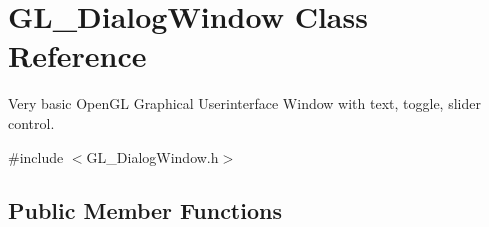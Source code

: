 \hypertarget{class_g_l___dialog_window}{\section{G\+L\+\_\+\+Dialog\+Window Class Reference}
\label{class_g_l___dialog_window}
}


Very basic Open\+G\+L Graphical Userinterface Window with text, toggle, slider control.  




{\ttfamily \#include $<$G\+L\+\_\+\+Dialog\+Window.\+h$>$}

\subsection*{Public Member Functions}

